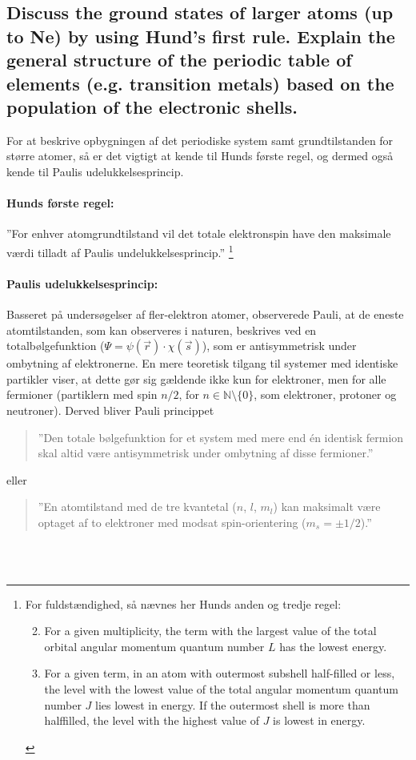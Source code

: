 \subsection{Discuss the ground states of larger atoms (up to Ne) by using Hund's first rule. Explain the general structure of the periodic table of elements (e.g. transition metals) based on the population of the electronic shells.}


For at beskrive opbygningen af det periodiske system samt grundtilstanden for større atomer, så er det vigtigt at kende til Hunds første regel, og dermed også kende til Paulis udelukkelsesprincip.

\paragraph{Hunds første regel:} ''For enhver atomgrundtilstand vil det totale elektronspin have den maksimale værdi tilladt af Paulis undelukkelsesprincip.'' \footnote{For fuldstændighed, så nævnes her Hunds anden og tredje regel:
\begin{enumerate}
    \setcounter{enumi}{1}
    \item For a given multiplicity, the term with the largest value of the total orbital angular momentum quantum number $L$ has the lowest energy.
    \item For a given term, in an atom with outermost subshell half-filled or less, the level with the lowest value of the total angular momentum quantum number $J$ lies lowest in energy. If the outermost shell is more than halffilled, the level with the highest value of $J$ is lowest in energy.
\end{enumerate}
}

\paragraph{Paulis udelukkelsesprincip:} Basseret på undersøgelser af fler-elektron atomer, observerede Pauli, at de eneste atomtilstanden, som kan observeres i naturen, beskrives ved en totalbølgefunktion ($\Psi = \psi(\Vec{r})\cdot\chi(\Vec{s})$), som er antisymmetrisk under ombytning af elektronerne. En mere teoretisk tilgang til systemer med identiske partikler viser, at dette gør sig gældende ikke kun for elektroner, men for alle fermioner (partiklern med spin $n/2$, for $n\in\mathbb{N}\setminus\{0\}$, som elektroner, protoner og neutroner). Derved bliver Pauli princippet
\begin{quote}
    ''Den totale bølgefunktion for et system med mere end én identisk fermion skal altid være antisymmetrisk under ombytning af disse fermioner.''
\end{quote}
eller
\begin{quote}
    ''En atomtilstand med de tre kvantetal ($n$, $l$, $m_l$) kan maksimalt være optaget af to elektroner med modsat spin-orientering ($m_s = \pm 1/2$).''
\end{quote}
$ $\\\\

